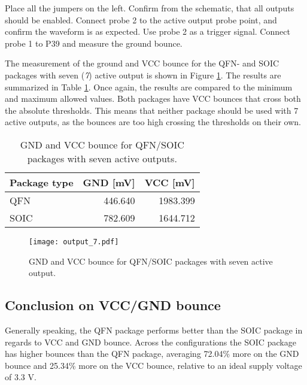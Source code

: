 \documentclass[../main.tex]{subfiles}
\begin{document}
Place all the jumpers on the left. Confirm from the schematic, that all outputs should be enabled. Connect probe 2 to the active output probe point, and confirm the waveform is as expected. Use probe 2 as a trigger signal. Connect probe 1 to P39 and measure the ground bounce.

\solution

The measurement of the ground and VCC bounce for the QFN- and SOIC packages with seven (\textit{7}) active output is shown in Figure \ref{fig:gnd_vcc_output_7}. The results are summarized in Table \ref{tab:output_7}. Once again, the results are compared to the minimum and maximum allowed values. Both packages have VCC bounces that cross both the absolute thresholds. This means that neither package should be used with 7 active outputs, as the bounces are too high crossing the thresholds on their own.

\begin{table}[h]
    \centering
    \begin{tabular}{l | r r}
        \toprule[1pt]
        Package type    & GND [mV]  & VCC [mV]\\
        \midrule
        QFN             & 446.640   & 1983.399  \\
        SOIC            & 782.609   & 1644.712  \\
        \bottomrule[1pt]
    \end{tabular}
    \caption{GND and VCC bounce for QFN/SOIC packages with seven active outputs.}
    \label{tab:output_7}
\end{table}

\newpage

\begin{figure}[h]
    \centering
    \texttt{[image: output\_7.pdf]}
    \caption{GND and VCC bounce for QFN/SOIC packages with seven active output.}
    \label{fig:gnd_vcc_output_7}
\end{figure}

\subsection{Conclusion on VCC/GND bounce}

\solution

Generally speaking, the QFN package performs better than the SOIC package in regards to VCC and GND bounce. Across the configurations the SOIC package has higher bounces than the QFN package, averaging 72.04\% more on the GND bounce and 25.34\% more on the VCC bounce, relative to an ideal supply voltage of 3.3 V. 
\end{document}
